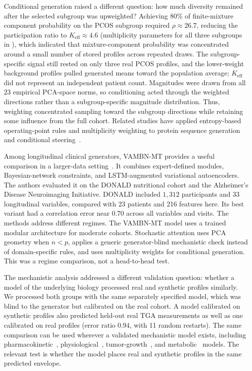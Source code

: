 Conditional generation raised a different question: how much diversity remained after the
selected subgroup was upweighted? Achieving
80\% of finite-mixture component probability on the PCOS subgroup required
$\rho \approx 26.7$, reducing the participation ratio to
$K_{\text{eff}} \approx 4.6$ (multiplicity parameters
for all three subgroups in ),
which indicated that mixture-component probability was concentrated around a small number
of stored profiles across repeated draws. The subgroup-specific signal still rested on only
three real PCOS profiles, and the lower-weight background profiles pulled generated means
toward the population average; $K_{\text{eff}}$ did not represent an independent patient
count. Magnitudes were drawn from all $23$ empirical PCA-space norms, so conditioning acted
through the weighted directions rather than a subgroup-specific magnitude distribution.
Thus, weighting concentrated sampling toward the subgroup directions while retaining some
influence from the full cohort.
Related studies have applied entropy-based operating-point rules
and multiplicity weighting to protein sequence generation and conditional
steering~\citep{Varner2026SAProtein,Varner2026Multiplicity,Alswaidan2026SA}.

Among longitudinal clinical generators, VAMBN-MT provides a useful comparison in a
larger-data setting~\citep{Kuhnel2024}. It combines
expert-defined modules, Bayesian-network constraints, and LSTM-augmented variational
autoencoders. The authors evaluated it on the DONALD nutritional cohort and the Alzheimer's
Disease Neuroimaging Initiative. DONALD included $1{,}312$ participants and 33 longitudinal
variables, compared with 23 patients and 216 features here. Its best variant had a correlation error near 0.70 across all variables and
visits. The methods address different regimes. The VAMBN-MT model uses a trained modular architecture
for moderate cohorts. Stochastic attention uses PCA geometry when $n<p$, applies a generic
generator-blind mechanistic check instead of domain-specific rules, and uses multiplicity
weights for conditional generation. This was a regime comparison, not a head-to-head test.

The mechanistic analysis addressed a different validation question: whether a model of the
underlying biology processed real and synthetic profiles similarly. We processed both groups
with the same separately specified model, which was blind to the generator but
calibrated on the real cohort. A model calibrated on synthetic profiles also
predicted held-out real TGA measurements as well as one calibrated on real profiles (error
ratio $0.94$, with 11 random restarts). The same comparison can be used wherever a validated
mechanistic model exists, including pharmacokinetic~\citep{MouldUpton2013},
physiological~\citep{Chase2011}, tumor-growth~\citep{Ribba2012}, and
metabolic~\citep{Yizhak2015,Shan2018} models. The relevant test is whether the model places
real and synthetic profiles in the same predicted envelope.

